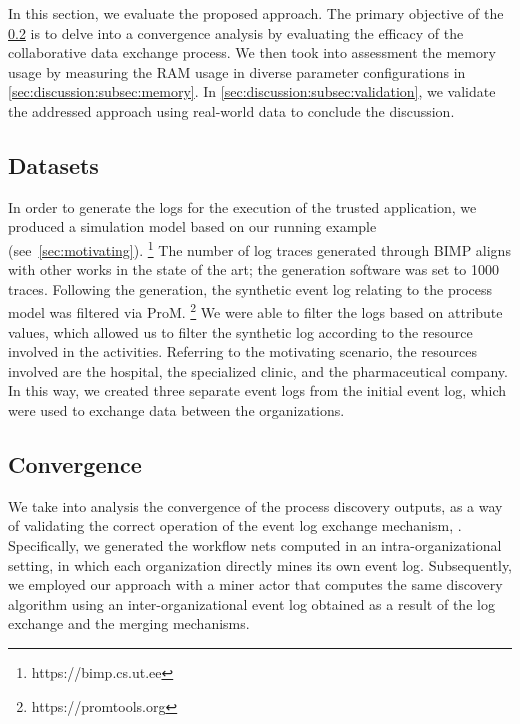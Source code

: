 In this section, we evaluate the proposed approach. The primary objective of the \cref{sec:discussion:subsec:convergence} is to delve into a convergence analysis by evaluating the efficacy of the collaborative data exchange process. We then took into assessment the memory usage by measuring the RAM usage in diverse parameter configurations in \cref{sec:discussion:subsec:memory}. In \cref{sec:discussion:subsec:validation}, we validate the addressed approach using real-world data to conclude the discussion. 

\subsection{Datasets}
In order to generate the logs for the execution of the trusted application, we produced a simulation model based on our running example (see~\cref{sec:motivating}).%
\footnote{https://bimp.cs.ut.ee}
The number of log traces generated through BIMP aligns with other works in the state of the art; the generation software was set to 1000 traces.
Following the generation, the synthetic event log relating to the process model was filtered via ProM.%
\footnote{https://promtools.org}
We were able to filter the logs based on attribute values, which allowed us to filter the synthetic log according to the resource involved in the activities. Referring to the motivating scenario, the resources involved are the hospital, the specialized clinic, and the pharmaceutical company. In this way, we created three separate event logs from the initial event log, which were used to exchange data between the organizations.


\subsection{Convergence}
\label{sec:discussion:subsec:convergence}  

We take into analysis the convergence of the process discovery outputs, as a way of validating the correct operation of the event log exchange mechanism, . Specifically, we generated the workflow nets computed in an intra-organizational setting, in which each organization directly mines its own event log. Subsequently, we employed our approach with a miner actor that computes the same discovery algorithm using an inter-organizational event log obtained as a result of the log exchange and the merging mechanisms. 

